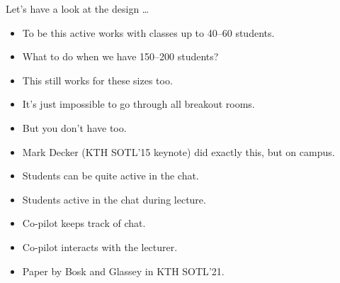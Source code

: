 \begin{frame}
  Let's have a look at the design \dots
\end{frame}

\begin{frame}
  \begin{question}
    \begin{itemize}
      \item To be this active works with classes up to 40--60 students.
      \item What to do when we have 150--200 students?
    \end{itemize}
  \end{question}
\end{frame}

\begin{frame}
  \begin{remark}
    \begin{itemize}
      \item This still works for these sizes too.
      \item It's just impossible to go through all breakout rooms.
      \item But you don't have too.
      \item Mark Decker (KTH SOTL'15 keynote) did exactly this, but on campus.
    \end{itemize}
  \end{remark}
\end{frame}

\begin{frame}
  \begin{remark}
    \begin{itemize}
      \item Students can be quite active in the chat.
    \end{itemize}
  \end{remark}

  \pause

  \begin{solution}[Co-pilot]
    \begin{itemize}
      \item Students active in the chat during lecture.
      \item Co-pilot keeps track of chat.
      \item Co-pilot interacts with the lecturer.
      \item Paper by Bosk and Glassey in KTH SOTL'21.
    \end{itemize}
  \end{solution}
\end{frame}

